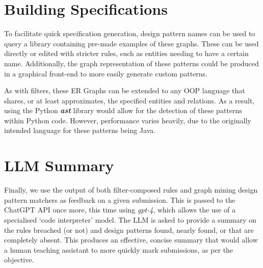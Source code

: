 \section{Building Specifications}

To facilitate quick specification generation, design pattern names can be used to query a library containing pre-made examples of these graphs. These can be used directly or edited with stricter rules, such as entities needing to have a certain name. Additionally, the graph representation of these patterns could be produced in a graphical front-end to more easily generate custom patterns.

As with filters, these ER Graphs can be extended to any OOP language that shares, or at least approximates, the specified entities and relations. As a result, using the Python \textbf{\emph{ast}} library would allow for the detection of these patterns within Python code. However, performance varies heavily, due to the originally intended language for these patterns being Java.

\section{LLM Summary}
Finally, we use the output of both filter-composed rules and graph mining design pattern matchers as feedback on a given submission. This is passed to the ChatGPT API once more, this time using \emph{gpt-4}, which allows the use of a specialised `code interpreter' model. The LLM is asked to provide a summary on the rules breached (or not) and design patterns found, nearly found, or that are completely absent. This produces an effective, concise summary that would allow a human teaching assistant to more quickly mark submissions, as per the objective.